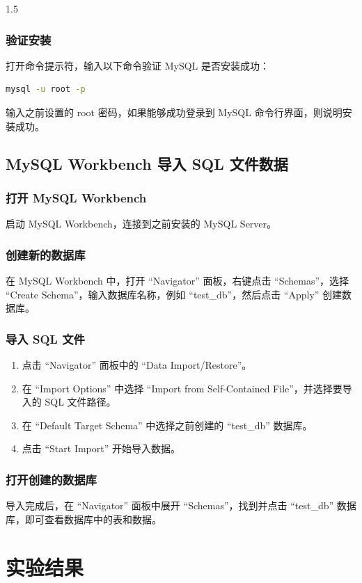 \documentclass[a4paper,12pt]{report}
\begin{document}
\begin{spacing}{1.5}
\subsection{验证安装}
打开命令提示符，输入以下命令验证 MySQL 是否安装成功：
\begin{lstlisting}[language=bash]
mysql -u root -p
\end{lstlisting}
输入之前设置的 root 密码，如果能够成功登录到 MySQL 命令行界面，则说明安装成功。

\section{MySQL Workbench 导入 SQL 文件数据}
\subsection{打开 MySQL Workbench}
启动 MySQL Workbench，连接到之前安装的 MySQL Server。

\subsection{创建新的数据库}
在 MySQL Workbench 中，打开 “Navigator” 面板，右键点击 “Schemas”，选择 “Create Schema”，输入数据库名称，例如 “test\_db”，然后点击 “Apply” 创建数据库。

\subsection{导入 SQL 文件}
\begin{enumerate}
    \item 点击 “Navigator” 面板中的 “Data Import/Restore”。
    \item 在 “Import Options” 中选择 “Import from Self-Contained File”，并选择要导入的 SQL 文件路径。
    \item 在 “Default Target Schema” 中选择之前创建的 “test\_db” 数据库。
    \item 点击 “Start Import” 开始导入数据。
\end{enumerate}

\subsection{打开创建的数据库}
导入完成后，在 “Navigator” 面板中展开 “Schemas”，找到并点击 “test\_db” 数据库，即可查看数据库中的表和数据。

\chapter{实验结果}

\end{spacing}
\end{document}
